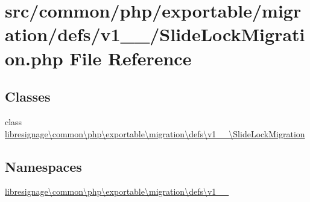 \hypertarget{v1__1__0_2SlideLockMigration_8php}{}\section{src/common/php/exportable/migration/defs/v1\+\_\+\_/\+Slide\+Lock\+Migration.php File Reference}
\label{v1__1__0_2SlideLockMigration_8php}
\subsection*{Classes}
\begin{DoxyCompactItemize}
\item 
class \hyperlink{classlibresignage_1_1common_1_1php_1_1exportable_1_1migration_1_1defs_1_1v1__1__0_1_1SlideLockMigration}{libresignage\textbackslash{}common\textbackslash{}php\textbackslash{}exportable\textbackslash{}migration\textbackslash{}defs\textbackslash{}v1\+\_\+\_\textbackslash{}\+Slide\+Lock\+Migration}
\end{DoxyCompactItemize}
\subsection*{Namespaces}
\begin{DoxyCompactItemize}
\item 
 \hyperlink{namespacelibresignage_1_1common_1_1php_1_1exportable_1_1migration_1_1defs_1_1v1__1__0}{libresignage\textbackslash{}common\textbackslash{}php\textbackslash{}exportable\textbackslash{}migration\textbackslash{}defs\textbackslash{}v1\+\_\+\_}
\end{DoxyCompactItemize}
